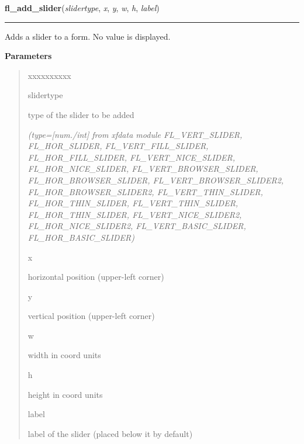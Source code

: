     \vspace{0.5ex}

\hspace{.8\funcindent}\begin{boxedminipage}{\funcwidth}

    \raggedright \textbf{fl\_add\_slider}(\textit{slidertype}, \textit{x}, \textit{y}, \textit{w}, \textit{h}, \textit{label})

    \vspace{-1.5ex}

    \rule{\textwidth}{0.5\fboxrule}
\setlength{\parskip}{2ex}
    Adds a slider to a form. No value is displayed.

\setlength{\parskip}{1ex}
      \textbf{Parameters}
      \vspace{-1ex}

      \begin{quote}
        \begin{Ventry}{xxxxxxxxxx}

          \item[slidertype]

          type of the slider to be added

            {\it (type=[num./int] from xfdata module FL\_VERT\_SLIDER, FL\_HOR\_SLIDER, 
FL\_VERT\_FILL\_SLIDER, FL\_HOR\_FILL\_SLIDER, FL\_VERT\_NICE\_SLIDER, 
FL\_HOR\_NICE\_SLIDER, FL\_VERT\_BROWSER\_SLIDER, FL\_HOR\_BROWSER\_SLIDER,
FL\_VERT\_BROWSER\_SLIDER2, FL\_HOR\_BROWSER\_SLIDER2, 
FL\_VERT\_THIN\_SLIDER, FL\_HOR\_THIN\_SLIDER, FL\_VERT\_THIN\_SLIDER, 
FL\_HOR\_THIN\_SLIDER, FL\_VERT\_NICE\_SLIDER2, FL\_HOR\_NICE\_SLIDER2, 
FL\_VERT\_BASIC\_SLIDER, FL\_HOR\_BASIC\_SLIDER)}

          \item[x]

          horizontal position (upper-left corner)

          \item[y]

          vertical position (upper-left corner)

          \item[w]

          width in coord units

          \item[h]

          height in coord units

          \item[label]

          label of the slider (placed below it by default)


\end{Ventry}
\end{quote}
\end{boxedminipage}
